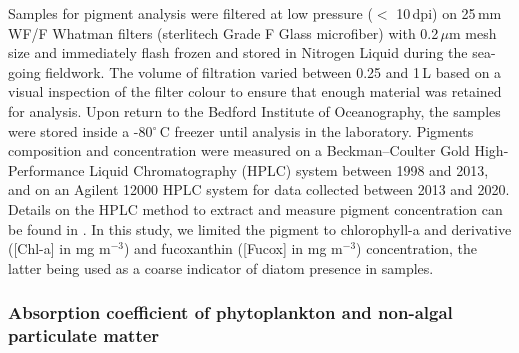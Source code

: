\documentclass[utf8]{frontiersSCNS} %
\begin{document}
Samples for pigment analysis were filtered at low pressure ($<$ 10\,dpi) on 25\,mm WF/F Whatman filters (sterlitech Grade F Glass microfiber) with 0.2\,$\mu$m mesh size and immediately flash frozen and stored in Nitrogen Liquid during the sea-going fieldwork. The volume of filtration varied between 0.25 and 1\,L based on a visual inspection of the filter colour to ensure that enough material was retained for analysis. Upon return to the Bedford Institute of Oceanography, the samples were stored inside a -80$^\circ$\,C freezer until analysis in the laboratory. Pigments composition and concentration were measured on a Beckman–Coulter Gold High-Performance Liquid Chromatography (HPLC) system between 1998 and 2013, and on an Agilent 12000 HPLC system for data collected between 2013 and 2020. Details on the HPLC method to extract and measure pigment concentration can be found in \cite{Head1993}. In this study, we limited the pigment to chlorophyll-a and derivative ([Chl-a] in mg m$^{-3}$) and fucoxanthin ([Fucox] in mg m$^{-3}$) concentration, the latter being used as a coarse indicator of diatom presence in samples.

\subsubsection{Absorption coefficient of phytoplankton and non-algal particulate matter}
\end{document}
